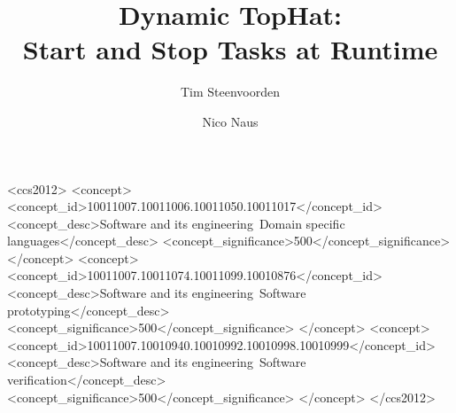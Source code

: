 \documentclass[sigconf,screen,review]{acmart}
\begin{document}
\title[Dynamic TopHat]{Dynamic TopHat:\\ Start and Stop Tasks at Runtime}

\author{Tim Steenvoorden}

\author{Nico Naus}

\renewcommand{\shortauthors}{Steenvoorden and Naus}

\begin{abstract}

  

\end{abstract}

\begin{CCSXML}
<ccs2012>
   <concept>
       <concept_id>10011007.10011006.10011050.10011017</concept_id>
       <concept_desc>Software and its engineering~Domain specific languages</concept_desc>
       <concept_significance>500</concept_significance>
       </concept>
   <concept>
       <concept_id>10011007.10011074.10011099.10010876</concept_id>
       <concept_desc>Software and its engineering~Software prototyping</concept_desc>
       <concept_significance>500</concept_significance>
       </concept>
   <concept>
       <concept_id>10011007.10010940.10010992.10010998.10010999</concept_id>
       <concept_desc>Software and its engineering~Software verification</concept_desc>
       <concept_significance>500</concept_significance>
       </concept>
 </ccs2012>
\end{CCSXML}
\end{document}
